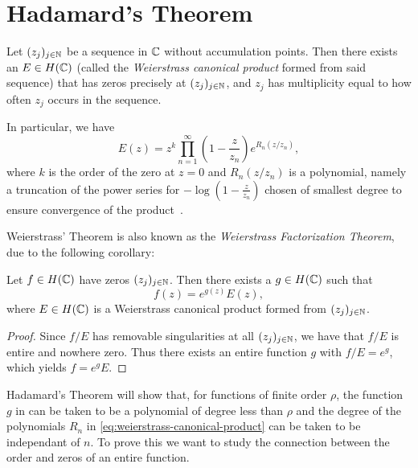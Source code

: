 \section{Hadamard's Theorem}
\label{sec:hadamards-theorem}

\begin{theorem} \label{thm:weierstrass}
    Let $(z_j)_{j \in \mathbb{N}}$ be a sequence in $\mathbb{C}$ without accumulation points. Then there exists an $E \in H(\mathbb{C})$ (called the \emph{Weierstrass canonical product} formed from said sequence) that has zeros precisely at $(z_j)_{j \in \mathbb{N}}$, and $z_j$ has multiplicity equal to how often $z_j$ occurs in the sequence.
\end{theorem}

In particular, we have
\begin{equation} \label{eq:weierstrass-canonical-product}
    E(z) = z^k \prod_{n=1}^\infty \left( 1 - \frac{z}{z_n} \right) e^{R_n(z / z_n)},
\end{equation}
where $k$ is the order of the zero at $z = 0$ and $R_n(z/z_n)$ is a polynomial, namely a truncation of the power series for $-\log(1 - \frac{z}{z_n})$ chosen of smallest degree to ensure convergence of the product~\cite{segal-complex-analysis}.

Weierstrass' Theorem is also known as the \emph{Weierstrass Factorization Theorem}, due to the following corollary:

\begin{corollary} \label{cor:weierstrass-factorization}
    Let $f \in H(\mathbb{C})$ have zeros $(z_j)_{j \in \mathbb{N}}$. Then there exists a $g \in H(\mathbb{C})$ such that
    $$ f(z) = e^{g(z)} E(z), $$
    where $E \in H(\mathbb{C})$ is a Weierstrass canonical product formed from $(z_j)_{j \in \mathbb{N}}$.
\end{corollary}

\begin{proof}
    Since $f / E$ has removable singularities at all $(z_j)_{j \in \mathbb{N}}$, we have that $f / E$ is entire and nowhere zero. Thus there exists an entire function $g$ with $f / E = e^g$, which yields $f = e^g E$.
\end{proof}

Hadamard's Theorem will show that, for functions of finite order $\rho$, the function $g$ in  can be taken to be a polynomial of degree less than $\rho$ and the degree of the polynomials $R_n$ in \eqref{eq:weierstrass-canonical-product} can be taken to be independant of $n$. To prove this we want to study the connection between the order and zeros of an entire function.

